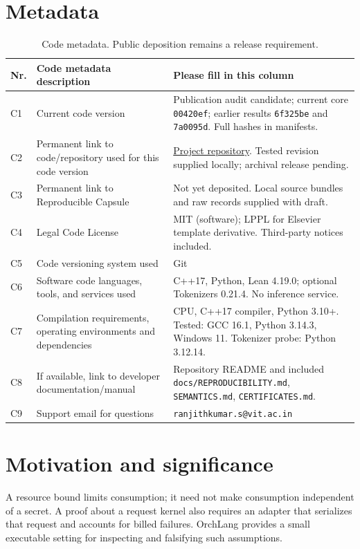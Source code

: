 \documentclass[preprint,12pt,a4paper]{elsarticle}
\begin{document}
\section*{Metadata}
\begin{table}[!ht]
\small
\begin{tabular}{|l|p{.38\linewidth}|p{.47\linewidth}|}
\hline
\textbf{Nr.} & \textbf{Code metadata description} & \textbf{Please fill in this column} \\
\hline
C1 & Current code version & Publication audit candidate; current core \texttt{00420ef}; earlier results \texttt{6f325be} and \texttt{7a0095d}. Full hashes in manifests. \\
\hline
C2 & Permanent link to code/repository used for this code version & \href{https://github.com/guyoverclocked/orchlang-compiler-design-project}{Project repository}. Tested revision supplied locally; archival release pending. \\
\hline
C3 & Permanent link to Reproducible Capsule & Not yet deposited. Local source bundles and raw records supplied with draft. \\
\hline
C4 & Legal Code License & MIT (software); LPPL for Elsevier template derivative. Third-party notices included. \\
\hline
C5 & Code versioning system used & Git \\
\hline
C6 & Software code languages, tools, and services used & C++17, Python, Lean 4.19.0; optional Tokenizers 0.21.4. No inference service. \\
\hline
C7 & Compilation requirements, operating environments and dependencies & CPU, C++17 compiler, Python 3.10+. Tested: GCC 16.1, Python 3.14.3, Windows 11. Tokenizer probe: Python 3.12.14. \\
\hline
C8 & If available, link to developer documentation/manual & Repository README and included \texttt{docs/REPRODUCIBILITY.md}, \texttt{SEMANTICS.md}, \texttt{CERTIFICATES.md}. \\
\hline
C9 & Support email for questions & \texttt{ranjithkumar.s@vit.ac.in} \\
\hline
\end{tabular}
\caption{Code metadata. Public deposition remains a release requirement.}
\end{table}

\section{Motivation and significance}
A resource bound limits consumption; it need not make consumption independent
of a secret. A proof about a request kernel also requires an adapter that
serializes that request and accounts for billed failures. OrchLang provides a
small executable setting for inspecting and falsifying such assumptions.
\end{document}
